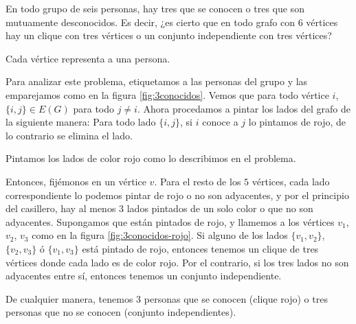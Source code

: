 \begin{prob}\label{prob:2}
    En todo grupo de seis personas, hay tres que se conocen o tres que son mutuamente desconocidos. Es decir, ¿es cierto que en todo grafo con $6$ vértices hay un clique con tres vértices o un conjunto independiente con tres vértices?
    
    \begin{marginfigure}
        \centering
        \caption{Cada vértice representa a una persona.}
        \label{fig:3conocidos}
    \end{marginfigure}
    
    Para analizar este problema, etiquetamos a las personas del grupo y las emparejamos como en la figura \ref{fig:3conocidos}. Vemos que para todo vértice $i$, $\{i,j\} \in E(G)$ para todo $j \neq i$. Ahora procedamos a pintar los lados del grafo de la siguiente manera: Para todo lado $\{i,j\}$, si $i$ conoce a $j$ lo pintamos de rojo, de lo contrario se elimina el lado.
    
    \begin{marginfigure}
        \centering
        \caption{Pintamos los lados de color rojo como lo describimos en el problema.}
        \label{fig:3conocidos-rojo}
    \end{marginfigure}
    
    Entonces, fijémonos en un vértice $v$. Para el resto de los $5$ vértices, cada lado correspondiente lo podemos pintar de rojo o no son adyacentes, y por el principio del casillero, hay al menos $3$ lados pintados de un solo color o que no son adyacentes. Supongamos que están pintados de rojo, y llamemos a los vértices $v_1$, $v_2$, $v_3$ como en la figura \ref{fig:3conocidos-rojo}. Si alguno de los lados $\{v_1, v_2\}$, $\{v_2, v_3\}$ ó $\{v_1, v_3\}$ está pintado de rojo, entonces tenemos un clique de tres vértices donde cada lado es de color rojo. Por el contrario, si los tres lados no son adyacentes entre sí, entonces tenemos un conjunto independiente.
    
    De cualquier manera, tenemos $3$ personas que se conocen (clique rojo) o tres personas que no se conocen (conjunto independientes).
\end{prob}

